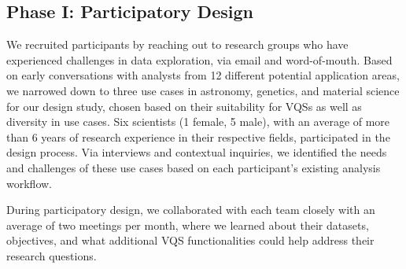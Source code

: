  \subsection{Phase I: Participatory Design}
  \par We recruited participants by reaching out to research groups who have experienced challenges in data exploration, via email and word-of-mouth. Based on early conversations with analysts from 12 different potential application areas, we narrowed down to three use cases in astronomy, genetics, and material science for our design study, chosen based on their suitability for VQSs as well as diversity in use cases. Six scientists (1 female, 5 male), with an average of more than 6 years of research experience in their respective fields, participated in the design process. Via interviews and contextual inquiries, we identified the needs and challenges of these use cases based on each participant's existing analysis workflow.
  \par {} During participatory design, we collaborated with each team closely with an average of two  meetings per month, where we learned about their datasets, objectives, and what additional VQS functionalities could help address their research questions. 
